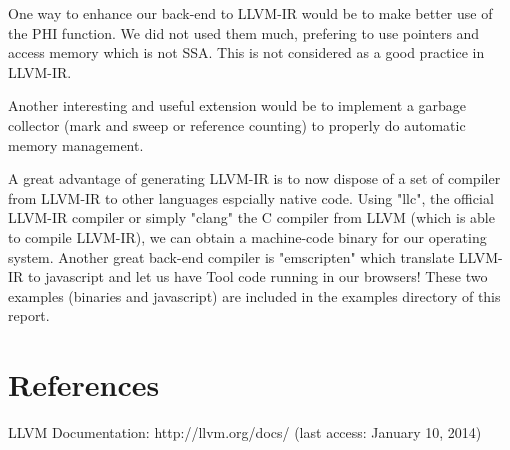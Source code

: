 One way to enhance our back-end to LLVM-IR would be to make better use of the PHI function. We did not used them much, prefering to use pointers and access memory which is not SSA. This is not considered as a good practice in LLVM-IR.

Another interesting and useful extension would be to implement a garbage collector (mark and sweep or reference counting) to properly do automatic memory management.

A great advantage of generating LLVM-IR is to now dispose of a set of compiler from LLVM-IR to other languages espcially native code. Using "llc", the official LLVM-IR compiler or simply "clang" the C compiler from LLVM (which is able to compile LLVM-IR), we can obtain a machine-code binary for our operating system. Another great back-end compiler is "emscripten" which translate LLVM-IR to javascript and let us have Tool code running in our browsers! These two examples (binaries and javascript) are included in the examples directory of this report.

\section*{References}
LLVM Documentation: http://llvm.org/docs/ (last access: January 10, 2014)
